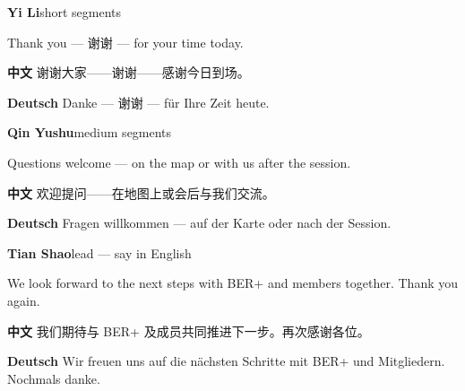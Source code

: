 \documentclass[11pt,a4paper]{ctexart}
\newenvironment{speakerblock}[2]{%
  \par\medskip
  {\color{berblue}\textbf{#1}}\hfill{\small\textcolor{bergrey}{#2}}\par
  \vspace{0.25em}
}{\par\medskip}
\begin{document}
\begin{speakerblock}{Yi Li}{short segments}
\begin{englishbox}
Thank you — 谢谢 — for your time today.
\end{englishbox}

\textbf{中文} 谢谢大家——谢谢——感谢今日到场。

\textbf{Deutsch} Danke — 谢谢 — für Ihre Zeit heute.
\end{speakerblock}


\begin{speakerblock}{Qin Yushu}{medium segments}
\begin{englishbox}
Questions welcome — on the map or with us after the session.
\end{englishbox}

\textbf{中文} 欢迎提问——在地图上或会后与我们交流。

\textbf{Deutsch} Fragen willkommen — auf der Karte oder nach der Session.
\end{speakerblock}


\begin{speakerblock}{Tian Shao}{lead — say in English}
\begin{englishbox}
We look forward to the next steps with BER+ and members together. Thank you again.
\end{englishbox}

\textbf{中文} 我们期待与 BER+ 及成员共同推进下一步。再次感谢各位。

\textbf{Deutsch} Wir freuen uns auf die nächsten Schritte mit BER+ und Mitgliedern. Nochmals danke.
\end{speakerblock}
\end{document}
